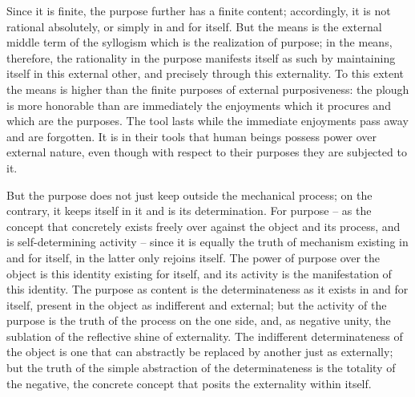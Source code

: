 Since it is finite, the purpose further has a finite content; accordingly, it
is not rational absolutely, or simply in and for itself. But the means is the
external middle term of the syllogism which is the realization of purpose;
in the means, therefore, the rationality in the purpose manifests itself as
such by maintaining itself in this external other, and precisely through this
externality. To this extent the means is higher than the finite purposes of
external purposiveness: the plough is more honorable than are immediately
the enjoyments which it procures and which are the purposes. The tool
lasts while the immediate enjoyments pass away and are forgotten. It is
in their tools that human beings possess power over external nature, even
though with respect to their purposes they are subjected to it.

But the purpose does not just keep outside the mechanical process; on
the contrary, it keeps itself in it and is its determination. For purpose –
as the concept that concretely exists freely over against the object and its
process, and is self-determining activity – since it is equally the truth of
mechanism existing in and for itself, in the latter only rejoins itself. The
power of purpose over the object is this identity existing for itself, and
its activity is the manifestation of this identity. The purpose as content is
the determinateness as it exists in and for itself, present in the object as
indifferent and external; but the activity of the purpose is the truth of the
process on the one side, and, as negative unity, the sublation of the reflective
shine of externality. The indifferent determinateness of the object is one
that can abstractly be replaced by another just as externally; but the truth of
the simple abstraction of the determinateness is the totality of the negative,
the concrete concept that posits the externality within itself.

